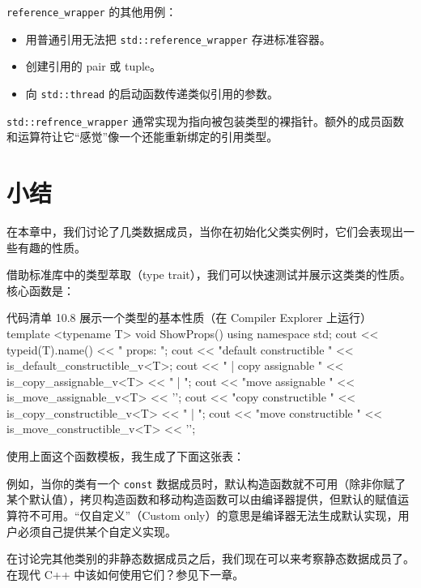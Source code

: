 \texttt{reference\_wrapper} 的其他用例：

\begin{itemize}
\item 用普通引用无法把 \texttt{std::reference\_wrapper} 存进标准容器。
\item 创建引用的 pair 或 tuple。
\item 向 \texttt{std::thread} 的启动函数传递类似引用的参数。
\end{itemize}

\begin{myInfoBox}
\texttt{std::refrence\_wrapper} 通常实现为指向被包装类型的裸指针。额外的成员函数和运算符让它“感觉”像一个还能重新绑定的引用类型。
\end{myInfoBox}

\section{小结}

在本章中，我们讨论了几类数据成员，当你在初始化父类实例时，它们会表现出一些有趣的性质。

借助标准库中的类型萃取（type trait），我们可以快速测试并展示这类类的性质。核心函数是：

\begin{codeboxt}[cpp]{代码清单 10.8 展示一个类型的基本性质（在 Compiler Explorer 上运行）}
template <typename T>
void ShowProps() {
using namespace std;
cout << typeid(T).name() << " props: \n";
cout << "default constructible " << is_default_constructible_v<T>;
cout << " | copy assignable " << is_copy_assignable_v<T> << " | ";
cout << "move assignable " << is_move_assignable_v<T> << '\n';
cout << "copy constructible " << is_copy_constructible_v<T> << " | ";
cout << "move constructible " << is_move_constructible_v<T> << '\n';
}
\end{codeboxt}

使用上面这个函数模板，我生成了下面这张表：


例如，当你的类有一个 \texttt{const} 数据成员时，默认构造函数就不可用（除非你赋了某个默认值），拷贝构造函数和移动构造函数可以由编译器提供，但默认的赋值运算符不可用。“仅自定义”（Custom only）的意思是编译器无法生成默认实现，用户必须自己提供某个自定义实现。

在讨论完其他类别的非静态数据成员之后，我们现在可以来考察静态数据成员了。在现代 C++ 中该如何使用它们？参见下一章。

